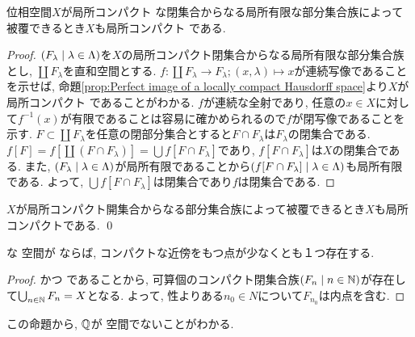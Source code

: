 \documentclass[uplatex, dvipdfmx, a4paper, 12pt, class=jsbook, crop=false]{standalone}
\begin{document}
\begin{proposition}
	位相空間$ X $が局所コンパクト \Hausdorff な閉集合からなる局所有限な部分集合族によって被覆できるとき$ X $も局所コンパクト \Hausdorff である.
\end{proposition}

\begin{proof}
	$ \setfamily{F_\lambda}{\lambda \in \Lambda} $を$ X $の局所コンパクト閉集合からなる局所有限な部分集合族とし, $ \coprod F_\lambda $を直和空間とする. $ f \colon \coprod F_\lambda \to F_\lambda \semicolon (x, \lambda) \mapsto x $が連続写像であることを示せば, 命題\ref{prop:Perfect image of a locally compact Hausdorff space}より$ X $が局所コンパクト \Hausdorff であることがわかる. $ f $が連続な全射であり, 任意の$ x \in X $に対して$ f^{-1}(x) $が有限であることは容易に確かめられるので$ f $が閉写像であることを示す. $ F \subset \coprod F_\lambda $を任意の閉部分集合とすると$ F \cap F_\lambda $は$ F_\lambda $の閉集合である. $ f[F] = f[\coprod (F \cap F_\lambda)]=\bigcup f[F \cap F_\lambda] $であり, $ f[F \cap F_\lambda] $は$ X $の閉集合である. また, $ \setfamily{F_\lambda}{\lambda \in \Lambda} $が局所有限であることから$ \setfamily{f[F \cap F_\lambda]}{\lambda \in \Lambda} $も局所有限である. よって, $ \bigcup f[F \cap F_\lambda] $は閉集合であり$ f $は閉集合である.
\end{proof}

\begin{proposition}
	$ X $が局所コンパクト開集合からなる部分集合族によって被覆できるとき$ X $も局所コンパクトである. \qed
\end{proposition}

\begin{proposition}
	\Hausdorff な \Baire 空間が \sigmaCompact ならば, コンパクトな近傍をもつ点が少なくとも１つ存在する.
\end{proposition}

\begin{proof}
	\sigmaCompact かつ \Hausdorff であることから, 可算個のコンパクト閉集合族$ \setfamily{F_n}{n \in \N} $が存在して$ \bigcup_{n \in \mathbb{N}} F_n = X $となる. よって, \Baire 性よりある$ n_0 \in N $について$ F_{n_0} $は内点を含む.
\end{proof}

この命題から, $ \mathbb{Q} $が \Baire 空間でないことがわかる.

\end{document}
